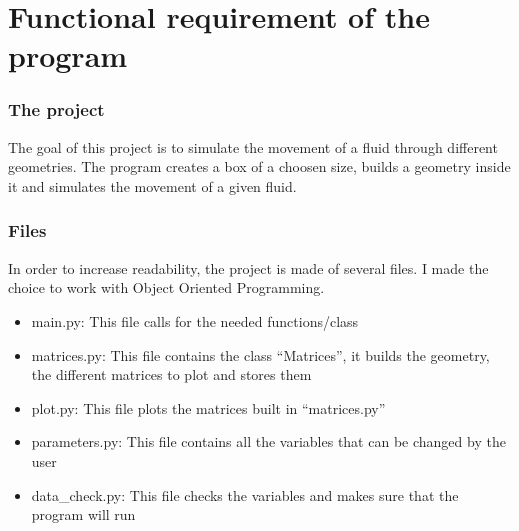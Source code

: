 \newpage
\part{Functional requirement of the program}
\section{The project}
The goal of this project is to simulate the movement of a fluid through
different geometries. The program creates a box of a choosen size, builds a
geometry inside it and simulates the movement of a given fluid.
\section{Files}
In order to increase readability, the project is made of several files.
I made the choice to work with Object Oriented Programming.
\begin{itemize}
      \item main.py: This file calls for the needed functions/class
      \item matrices.py: This file contains the class ``Matrices'', it builds
            the geometry, the different matrices to plot and stores them
      \item plot.py: This file plots the matrices built in ``matrices.py''
      \item parameters.py: This file contains all the variables that can be 
          changed by the user
      \item data\_check.py: This file checks the variables and makes sure that
          the program will run
\end{itemize}

